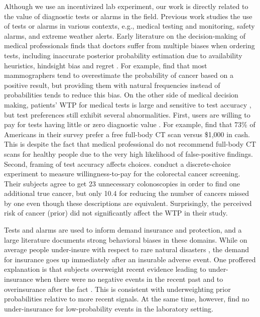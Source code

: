 \documentclass[12pt,a4paper]{article}
\begin{document}
Although we use an incentivized lab experiment, our work is directly related to the value of diagnostic tests or alarms in the field.  Previous work studies the use of tests or alarms in various contexts, e.g., medical testing and monitoring, safety alarms, and extreme weather alerts. Early literature on the decision-making of medical professionals finds that doctors suffer from multiple biases when ordering tests, including  inaccurate posterior probability estimation due to availability heuristics, hindsight bias and regret \citep{bornstein_rationality_2001}. For example, \citet{gigerenzer_helping_2007} find that most mammographers tend to overestimate the probability of cancer based on a positive result, but providing them with natural frequencies instead of probabilities tends to reduce this bias.  On the other side of medical decision making, patients' WTP for medical tests is large and sensitive to test accuracy \citep{liang_acceptability_2003, howard_does_2009, neumann_willingness--pay_2012}, but test preferences still exhibit several abnormalities. First, users are willing to pay for tests having little or zero diagnostic value \citep{schwartz_enthusiasm_2004, neumann_willingness--pay_2012}. For example, \citet{schwartz_enthusiasm_2004} find that 73\% of Americans in their survey prefer a free full-body CT scan versus \$1,000 in cash. This is despite the fact that medical professional do not recommend full-body CT scans for healthy people due to the very high likelihood of false-positive findings. Second, framing of test accuracy affects choices. \citet{howard_does_2009} conduct a discrete-choice experiment to measure willingness-to-pay for the colorectal cancer screening. Their subjects agree to get 23 unnecessary colonoscopies in order to find one additional true cancer, but only 10.4 for reducing the number of cancers missed by one even though these descriptions are equivalent. Surprisingly, the perceived risk of cancer (prior) did not significantly affect the WTP in their study.

Tests and alarms are used to inform demand insurance and protection, and a large literature documents strong behavioral biases in these domains. While on average people under-insure with respect to rare natural disasters \citep{friedl_insurance_2014}, the demand for insurance goes up immediately after an insurable adverse event. One proffered explanation is that subjects overweight recent evidence leading to under-insurance when there were no negative events in the recent past and to overinsurance after the fact \citep{volkman-wise_representativeness_2015}. This is consistent with underweighting prior probabilities relative to more recent signals. At the same time, however, \citet{laury_insurance_2009} find no under-insurance for low-probability events in the laboratory setting.  
\end{document}
